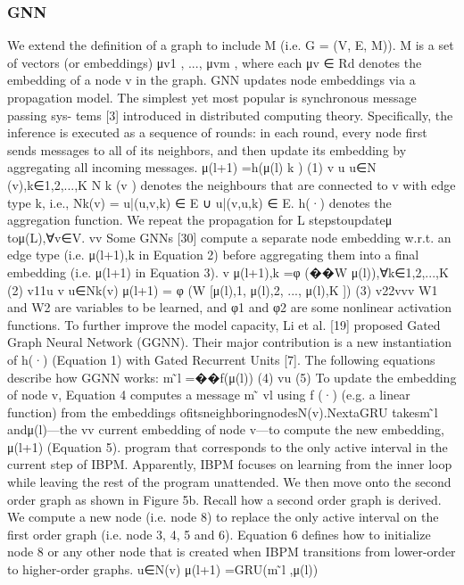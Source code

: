 \documentclass{article}
\begin{document}
\subsubsection{GNN}
We extend the definition of a graph to include M (i.e. G = (V, E, M)). M is a set of vectors (or embeddings) {μv1 , ..., μvm }, where each μv ∈ Rd denotes the embedding of a node v in the graph. GNN updates node embeddings via a propagation model. The simplest yet most popular is synchronous message passing sys- tems [3] introduced in distributed computing theory. Specifically, the inference is executed as a sequence of rounds: in each round, every node first sends messages to all of its neighbors, and then update its embedding by aggregating all incoming messages.
μ(l+1) =h({μ(l)} k ) (1) v u u∈N (v),k∈{1,2,...,K}
N k (v ) denotes the neighbours that are connected to v with edge type k, i.e., Nk(v) = {u|(u,v,k) ∈ E} ∪ {u|(v,u,k) ∈ E}. h(·) denotes the aggregation function. We repeat the propagation for L
stepstoupdateμ toμ(L),∀v∈V. vv
Some GNNs [30] compute a separate node embedding w.r.t. an edge type (i.e. μ(l+1),k in Equation 2) before aggregating them into
a final embedding (i.e. μ(l+1) in Equation 3). v
μ(l+1),k =φ (��W μ(l)),∀k∈{1,2,...,K} (2) v11u
   v
u∈Nk(v)
μ(l+1) = φ (W [μ(l),1, μ(l),2, ..., μ(l),K ]) (3)
v22vvv
W1 and W2 are variables to be learned, and φ1 and φ2 are some
nonlinear activation functions.
To further improve the model capacity, Li et al. [19] proposed
Gated Graph Neural Network (GGNN). Their major contribution is a new instantiation of h(·) (Equation 1) with Gated Recurrent Units [7]. The following equations describe how GGNN works:
m ̃l =��f(μ(l)) (4) vu
(5)
To update the embedding of node v, Equation 4 computes a
message m ̃ vl using f (·) (e.g. a linear function) from the embeddings
ofitsneighboringnodesN(v).NextaGRU takesm ̃l andμ(l)—the vv
current embedding of node v—to compute the new embedding, μ(l+1) (Equation 5).
program that corresponds to the only active interval in the current step of IBPM. Apparently, IBPM focuses on learning from the inner loop while leaving the rest of the program unattended.
We then move onto the second order graph as shown in Figure 5b. Recall how a second order graph is derived. We compute a new node (i.e. node 8) to replace the only active interval on the first order graph (i.e. node 3, 4, 5 and 6). Equation 6 defines how to initialize node 8 or any other node that is created when IBPM transitions from lower-order to higher-order graphs.
u∈N(v)
μ(l+1) =GRU(m ̃l ,μ(l))
\end{document}

